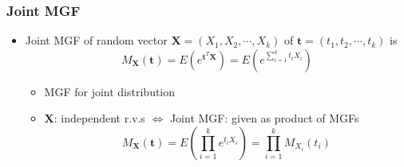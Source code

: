 \subsubsection*{Joint MGF}
\begin{itemize}
    \item Joint MGF of random vector $\mathbf{X}=\left(X_1,X_2,\cdots,X_k\right)$ of $\mathbf{t}=\left(t_1,t_2,\cdots,t_k\right)$ is
    \begin{equation}
        M_{\mathbf{X}}(\mathbf{t})=E\left(e^{\mathbf{t}^T\mathbf{X}}\right)=E\left(e^{\sum_{i=1}^kt_iX_i}\right)
    \end{equation}
    \begin{itemize}
        \item MGF for joint distribution
        \item $\mathbf{X}$: independent r.v.s $\iff$ Joint MGF: given as product of MGFs
        \begin{equation}
            M_{\mathbf{X}}(\mathbf{t})=E\left(\prod_{i=1}^ke^{t_iX_i}\right)=\prod_{i=1}^kM_{X_i}(t_i)
        \end{equation}
    \end{itemize}
\end{itemize}

